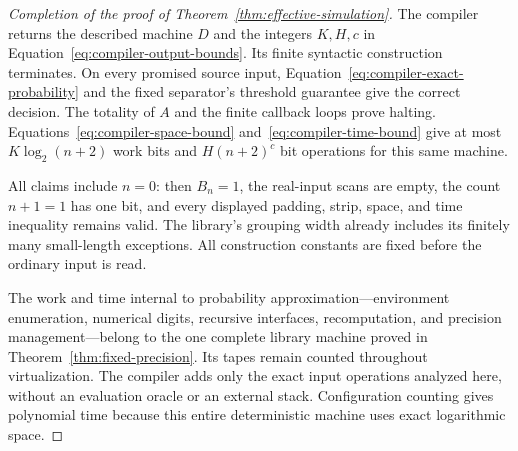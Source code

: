 \begin{proof}[Completion of the proof of Theorem~\ref{thm:effective-simulation}]
The compiler returns the described machine $D$ and the integers
$K,H,c$ in Equation~\eqref{eq:compiler-output-bounds}.  Its finite
syntactic construction terminates.  On every promised source input,
Equation~\eqref{eq:compiler-exact-probability} and the fixed separator's
threshold guarantee give the correct decision.  The totality of $A$
and the finite callback loops prove halting.  Equations~\eqref{eq:compiler-space-bound}
and~\eqref{eq:compiler-time-bound} give at most $K\log_2(n+2)$
work bits and $H(n+2)^c$ bit operations for this same machine.

All claims include $n=0$: then $B_n=1$, the real-input scans are empty,
the count $n+1=1$ has one bit, and every displayed padding, strip,
space, and time inequality remains valid.  The library's grouping
width already includes its finitely many small-length exceptions.
All construction constants are fixed before the ordinary input is read.

The work and time internal to probability approximation---environment
enumeration, numerical digits, recursive interfaces, recomputation,
and precision management---belong to the one complete library machine
proved in Theorem~\ref{thm:fixed-precision}.  Its tapes remain counted
throughout virtualization.  The compiler adds only the exact input
operations analyzed here, without an evaluation oracle or an external
stack.  Configuration counting gives polynomial time because this
entire deterministic machine uses exact logarithmic space.
\end{proof}

